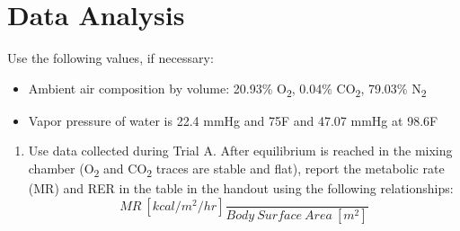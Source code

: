 \documentclass{article}
\begin{document}
\section*{Data Analysis}
Use the following values, if necessary:\begin{itemize}
	\item Ambient air composition by volume: 20.93\% O\textsubscript{2}, 0.04\% CO\textsubscript{2}, 79.03\% N\textsubscript{2}
	\item Vapor pressure of water is 22.4 mmHg and 75\degree F and 47.07 mmHg at 98.6\degree F
\end{itemize}

\begin{enumerate}
	\item Use data collected during Trial A. After equilibrium is reached in the mixing chamber (O\textsubscript{2} and CO\textsubscript{2} traces are stable and flat), report the metabolic rate (MR) and RER in the table in the handout using the following relationships:
	\begin{equation}
		MR\ [kcal/m^2/hr] \frac{}{Body\ Surface\ Area\ [m^2]}
	\end{equation}
\end{enumerate}
\end{document}

